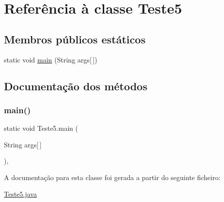 \hypertarget{class_teste5}{}\section{Referência à classe Teste5}
\label{class_teste5}
\subsection*{Membros públicos estáticos}
\begin{DoxyCompactItemize}
\item 
static void \hyperlink{class_teste5_a62dcd2a06ef26a32693d624fde3916b7}{main} (String args\mbox{[}$\,$\mbox{]})
\end{DoxyCompactItemize}


\subsection{Documentação dos métodos}
\hypertarget{class_teste5_a62dcd2a06ef26a32693d624fde3916b7}{}\label{class_teste5_a62dcd2a06ef26a32693d624fde3916b7} 
\subsubsection{\texorpdfstring{main()}{main()}}
{\footnotesize\ttfamily static void Teste5.\+main (\begin{DoxyParamCaption}\item[{String}]{args\mbox{[}$\,$\mbox{]} }\end{DoxyParamCaption})\hspace{0.3cm}{\ttfamily [inline]}, {\ttfamily [static]}}



A documentação para esta classe foi gerada a partir do seguinte ficheiro\+:\begin{DoxyCompactItemize}
\item 
\hyperlink{_teste5_8java}{Teste5.\+java}\end{DoxyCompactItemize}

